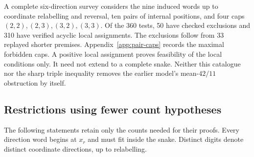 \documentclass[11pt,a4paper]{article}
\theoremstyle{definition}
\theoremstyle{remark}
\begin{document}
A complete six-direction survey considers the nine induced words up to coordinate relabelling and reversal, ten pairs of internal positions, and four caps $(2,2),(2,3),(3,2),(3,3)$. Of the 360 tests, 50 have checked exclusions and 310 have verified acyclic local assignments. The exclusions follow from 33 replayed shorter premises. Appendix~\ref{app:pair-caps} records the maximal forbidden caps. A positive local assignment proves feasibility of the local conditions only. It need not extend to a complete snake. Neither this catalogue nor the sharp triple inequality removes the earlier model's mean-$42/11$ obstruction by itself.

\subsection{Restrictions using fewer count hypotheses}\label{sec:recent-counts}
The following statements retain only the counts needed for their proofs.
Every direction word begins at $x_r$ and must fit inside the snake. Distinct
digits denote distinct coordinate directions, up to relabelling.
\end{document}
